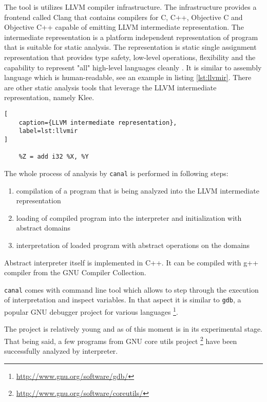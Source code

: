 \documentclass[12pt,final,oneside]{fithesis2}
\theoremstyle{definition}
\begin{document}
The tool is utilizes LLVM compiler infrastructure. The infrastructure provides
a frontend called Clang that contains compilers for C, C++, Objective C and
Objective C++ capable of emitting LLVM intermediate representation. The
intermediate representation is a platform independent representation of
program that is suitable for static analysis. The representation is static
single assignment representation that provides type safety, low-level operations,
flexibility and the capability to represent "all" high-level languages cleanly
\cite{llvm13-1}. It is similar to assembly language which is human-readable,
see an example in listing \ref{lst:llvmir}. There are other static analysis tools
that leverage the LLVM intermediate representation, namely Klee.

\begin{lstlisting}[
    caption={LLVM intermediate representation},
    label=lst:llvmir
]

    %Z = add i32 %X, %Y

\end{lstlisting}

The whole process of analysis by \texttt{canal} is performed in following steps:

\begin{enumerate}

\item compilation of a program that is being analyzed into the LLVM intermediate
representation

\item loading of compiled program into the interpreter and initialization
with abstract domains

\item interpretation of loaded program with abstract operations on the
domains

\end{enumerate}

Abstract interpreter itself is implemented in C++. It can be compiled with
g++ compiler from the GNU Compiler Collection.

\texttt{canal} comes with command line tool which allows to step through
the execution of interpretation and inspect variables. In that aspect it
is similar to \texttt{gdb}, a popular GNU debugger project for various
languages \footnote{\url{http://www.gnu.org/software/gdb/}}.

The project is relatively young and as of this moment is in its experimental
stage. That being said, a few programs from GNU core utils project
\footnote{\url{http://www.gnu.org/software/coreutils/}} have been
successfully analyzed by interpreter.
\end{document}
